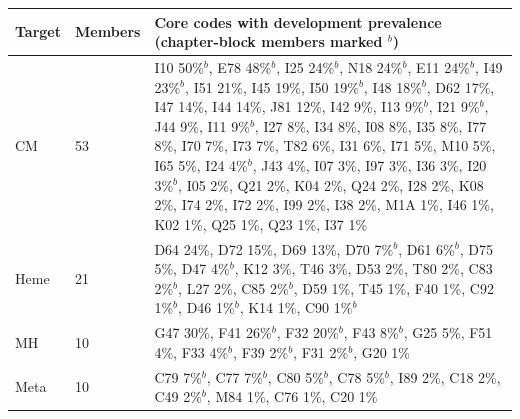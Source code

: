 \begin{tabular}{llp{}}
\hline
Target & Members & Core codes with development prevalence (chapter-block members marked $^{b}$) \\
\hline
CM & 53 & I10 50\%$^{b}$, E78 48\%$^{b}$, I25 24\%$^{b}$, N18 24\%$^{b}$, E11 24\%$^{b}$, I49 23\%$^{b}$, I51 21\%, I45 19\%, I50 19\%$^{b}$, I48 18\%$^{b}$, D62 17\%, I47 14\%, I44 14\%, J81 12\%, I42 9\%, I13 9\%$^{b}$, I21 9\%$^{b}$, J44 9\%, I11 9\%$^{b}$, I27 8\%, I34 8\%, I08 8\%, I35 8\%, I77 8\%, I70 7\%, I73 7\%, T82 6\%, I31 6\%, I71 5\%, M10 5\%, I65 5\%, I24 4\%$^{b}$, J43 4\%, I07 3\%, I97 3\%, I36 3\%, I20 3\%$^{b}$, I05 2\%, Q21 2\%, K04 2\%, Q24 2\%, I28 2\%, K08 2\%, I74 2\%, I72 2\%, I99 2\%, I38 2\%, M1A 1\%, I46 1\%, K02 1\%, Q25 1\%, Q23 1\%, I37 1\% \\
Heme & 21 & D64 24\%, D72 15\%, D69 13\%, D70 7\%$^{b}$, D61 6\%$^{b}$, D75 5\%, D47 4\%$^{b}$, K12 3\%, T46 3\%, D53 2\%, T80 2\%, C83 2\%$^{b}$, L27 2\%, C85 2\%$^{b}$, D59 1\%, T45 1\%, F40 1\%, C92 1\%$^{b}$, D46 1\%$^{b}$, K14 1\%, C90 1\%$^{b}$ \\
MH & 10 & G47 30\%, F41 26\%$^{b}$, F32 20\%$^{b}$, F43 8\%$^{b}$, G25 5\%, F51 4\%, F33 4\%$^{b}$, F39 2\%$^{b}$, F31 2\%$^{b}$, G20 1\% \\
Meta & 10 & C79 7\%$^{b}$, C77 7\%$^{b}$, C80 5\%$^{b}$, C78 5\%$^{b}$, I89 2\%, C18 2\%, C49 2\%$^{b}$, M84 1\%, C76 1\%, C20 1\% \\
\hline
\end{tabular}
